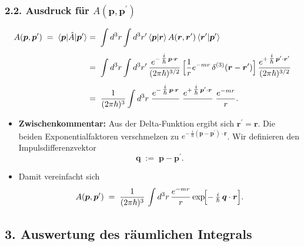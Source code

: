 \documentclass{scrartcl}
\begin{document}
\subsubsection*{2.2. Ausdruck für $A(\boldsymbol{p},\boldsymbol{p}^{\prime})$}
\begin{align*}
  A(\boldsymbol{p},\boldsymbol{p}^{\prime})
  \;=\; 
  \langle \boldsymbol{p} \rvert \hat{A} \lvert \boldsymbol{p}^{\prime} \rangle
  &=\;
  \int d^{3}r \int d^{3}r^{\prime}\,
  \langle \boldsymbol{p}\rvert\boldsymbol{r}\rangle\,
  A(\boldsymbol{r},\boldsymbol{r}^{\prime})\,
  \langle \boldsymbol{r}^{\prime}\rvert\boldsymbol{p}^{\prime}\rangle
  \\[1ex]
  &=\;
  \int d^{3}r \int d^{3}r^{\prime}\,
  \frac{e^{-\,\tfrac{i}{\hbar}\,\boldsymbol{p}\cdot\boldsymbol{r}}}{(2\pi\hbar)^{3/2}}\,
  \Bigl[\frac{1}{r}e^{-m r}\,\delta^{(3)}(\boldsymbol{r}-\boldsymbol{r}^{\prime})\Bigr]\,
  \frac{e^{+\,\tfrac{i}{\hbar}\,\boldsymbol{p}^{\prime}\cdot\boldsymbol{r}^{\prime}}}{(2\pi\hbar)^{3/2}}
  \\[1ex]
  &=\;
  \frac{1}{(2\pi\hbar)^{3}}
  \int d^{3}r \; \frac{e^{-\,\tfrac{i}{\hbar}\,\boldsymbol{p}\cdot\boldsymbol{r}}}{\;}\;
  \frac{e^{+\,\tfrac{i}{\hbar}\,\boldsymbol{p}^{\prime}\cdot\boldsymbol{r}}}{\;}\;
  \frac{e^{-m r}}{r}.
\end{align*}
\begin{itemize}
  \item \textbf{Zwischenkommentar:} 
    Aus der Delta-Funktion ergibt sich $\boldsymbol{r}^{\prime} = \boldsymbol{r}$. Die beiden Exponentialfaktoren verschmelzen zu $e^{-\,\tfrac{i}{\hbar}(\boldsymbol{p}-\boldsymbol{p}^{\prime})\cdot\boldsymbol{r}}$. Wir definieren den Impulsdifferenzvektor
    \[
      \boldsymbol{q} \;:=\; \boldsymbol{p} - \boldsymbol{p}^{\prime}.
    \]
  \item Damit vereinfacht sich
  \[
    A(\boldsymbol{p},\boldsymbol{p}^{\prime})
    \;=\;
    \frac{1}{(2\pi\hbar)^{3}}\,
    \int d^{3}r\,\frac{e^{-m r}}{r}
    \exp\!\Bigl[-\,\tfrac{i}{\hbar}\,\boldsymbol{q}\cdot\boldsymbol{r}\Bigr].
  \]
\end{itemize}

\subsection*{3. Auswertung des räumlichen Integrals}
\end{document}
